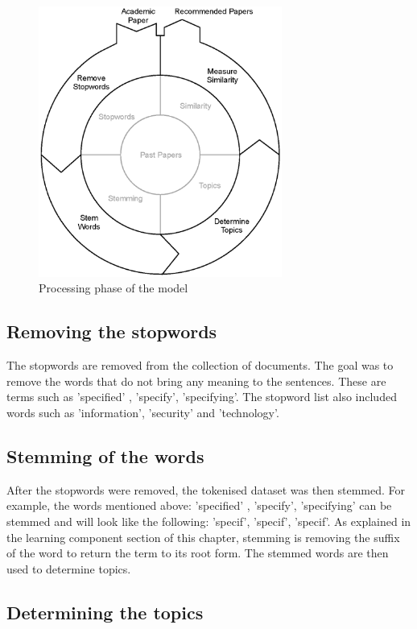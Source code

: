 \begin{figure}[htbp]
\centering
\includegraphics[width=8cm]{./figures/processing1.eps}
\caption{Processing phase of the model}
\label{fig:processing}
\end{figure}

\subsection{Removing the stopwords}

The stopwords are removed from the collection of documents. The goal was to remove the words that do not bring any meaning to the sentences. These are terms such as ’specified’ , ’specify’, ’specifying’. The stopword list also included words such as ’information’, ’security’ and ’technology’.

\subsection{Stemming of the words}

After the stopwords were removed, the tokenised dataset was then stemmed. For example, the words mentioned above: ’specified’ , ’specify’, ’specifying’ can be stemmed and will look like the following: ’specif’, ’specif’, ’specif’. As explained in the learning component section of this chapter, stemming is removing the suffix of the word to return the term to its root form. The stemmed words are then used to determine topics.

\subsection{Determining the topics} \label{ssec:topic}

